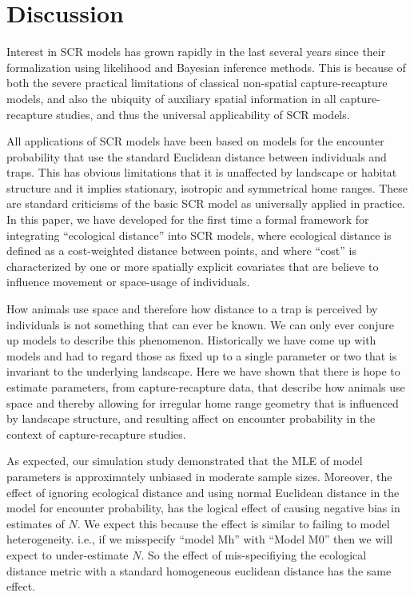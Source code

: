 \documentclass[12pt]{article}
\begin{document}
\section{Discussion}

Interest in SCR models has grown rapidly in the last several years
since their formalization using likelihood \citep{borchers_efford:2008}
and Bayesian \citep{royle_young:2008} inference methods. This is because
of both the severe practical limitations of classical non-spatial
capture-recapture models, and also the ubiquity of auxiliary spatial
information in all capture-recapture studies, and thus the universal
applicability of SCR models.

All applications of SCR models have been based on models for the
encounter probability that use the standard Euclidean distance between
individuals and traps. This has obvious limitations that it is
unaffected by landscape or habitat structure and it implies
stationary,  isotropic and symmetrical home ranges. These are standard
criticisms of the basic SCR model as universally applied in practice. 
In this paper,  we have developed for the first time a formal framework for integrating
``ecological distance'' into SCR models, where ecological distance is
defined as a cost-weighted distance between points, and where ``cost''
is characterized by one or more spatially explicit covariates that are
believe to influence movement or space-usage of individuals.  


How animals use space and therefore how distance to a trap is
perceived by individuals is not something that can ever be known. We
can only ever conjure up models to describe this
phenomenon. Historically we have come up with models and had to regard
those as fixed up to a single parameter or two that is invariant to
the underlying landscape. Here we have shown that there is hope to
estimate parameters, from capture-recapture data,
 that describe how animals use space and thereby
allowing for irregular home range geometry that is influenced by
landscape structure, and resulting affect on encounter probability in
the context of capture-recapture studies. 

As expected, our simulation study demonstrated that the MLE of model
parameters is approximately unbiased in moderate sample
sizes. Moreover, the 
effect of ignoring ecological distance and using normal Euclidean
distance in the model for encounter probability, has the 
logical effect of causing negative bias
in estimates of $N$. We expect this because the effect is similar to
failing to model heterogeneity. i.e., if we misspecify ``model Mh'' with
``Model M0'' then we will expect to under-estimate $N$. So the effect of
mis-specifiying the ecological distance metric with a standard
homogeneous euclidean distance has the same effect.
\end{document}
